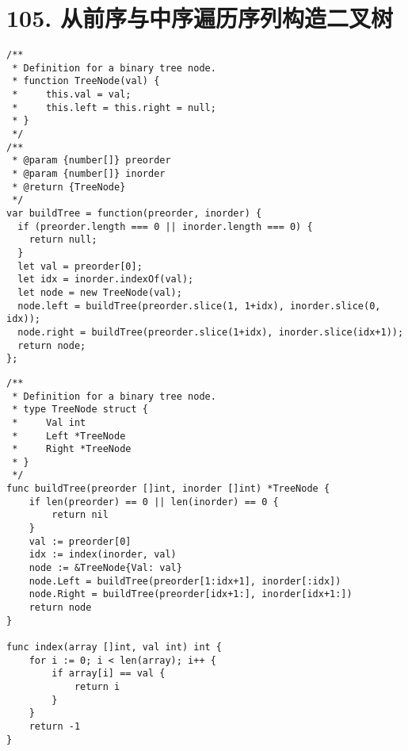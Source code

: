 \newpage
\section{105. 从前序与中序遍历序列构造二叉树}
\label{leetcode:105}

\begin{verbatim}
/**
 * Definition for a binary tree node.
 * function TreeNode(val) {
 *     this.val = val;
 *     this.left = this.right = null;
 * }
 */
/**
 * @param {number[]} preorder
 * @param {number[]} inorder
 * @return {TreeNode}
 */
var buildTree = function(preorder, inorder) {
  if (preorder.length === 0 || inorder.length === 0) {
    return null;
  }
  let val = preorder[0];
  let idx = inorder.indexOf(val);
  let node = new TreeNode(val);
  node.left = buildTree(preorder.slice(1, 1+idx), inorder.slice(0, idx));
  node.right = buildTree(preorder.slice(1+idx), inorder.slice(idx+1));
  return node;
};
\end{verbatim}

\begin{verbatim}
/**
 * Definition for a binary tree node.
 * type TreeNode struct {
 *     Val int
 *     Left *TreeNode
 *     Right *TreeNode
 * }
 */
func buildTree(preorder []int, inorder []int) *TreeNode {
	if len(preorder) == 0 || len(inorder) == 0 {
		return nil
	}
	val := preorder[0]
	idx := index(inorder, val)
	node := &TreeNode{Val: val}
	node.Left = buildTree(preorder[1:idx+1], inorder[:idx])
	node.Right = buildTree(preorder[idx+1:], inorder[idx+1:])
	return node
}

func index(array []int, val int) int {
	for i := 0; i < len(array); i++ {
		if array[i] == val {
			return i
		}
	}
	return -1
}
\end{verbatim}